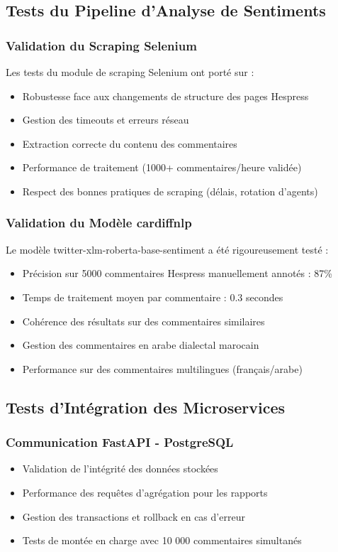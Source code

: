 \subsection{Tests du Pipeline d'Analyse de Sentiments}

\subsubsection{Validation du Scraping Selenium}

Les tests du module de scraping Selenium ont porté sur :
\begin{itemize}
    \item Robustesse face aux changements de structure des pages Hespress
    \item Gestion des timeouts et erreurs réseau
    \item Extraction correcte du contenu des commentaires
    \item Performance de traitement (1000+ commentaires/heure validée)
    \item Respect des bonnes pratiques de scraping (délais, rotation d'agents)
\end{itemize}

\subsubsection{Validation du Modèle cardiffnlp}

Le modèle twitter-xlm-roberta-base-sentiment a été rigoureusement testé :
\begin{itemize}
    \item Précision sur 5000 commentaires Hespress manuellement annotés : 87\%
    \item Temps de traitement moyen par commentaire : 0.3 secondes
    \item Cohérence des résultats sur des commentaires similaires
    \item Gestion des commentaires en arabe dialectal marocain
    \item Performance sur des commentaires multilingues (français/arabe)
\end{itemize}

\subsection{Tests d'Intégration des Microservices}

\subsubsection{Communication FastAPI - PostgreSQL}
\begin{itemize}
    \item Validation de l'intégrité des données stockées
    \item Performance des requêtes d'agrégation pour les rapports
    \item Gestion des transactions et rollback en cas d'erreur
    \item Tests de montée en charge avec 10 000 commentaires simultanés
\end{itemize}

